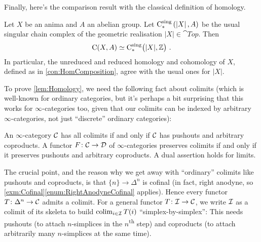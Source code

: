 Finally, here's the comparison result with the classical definition of homology.
\begin{lem}\label{lem:Homology}
	Let $X$ be an anima and $A$ an abelian group. Let $\operatorname{C}_*^\mathrm{sing}\left(\left|X\right|,A\right)$ be the usual singular chain complex of the geometric realisation $\left|X\right|\in\cat{Top}$. Then
	\begin{equation*}
		\C(X,A)\simeq \C^\mathrm{sing}_*\lef(|X|,\IZ\righ)\,.
	\end{equation*}
	In particular, the unreduced and reduced homology and cohomology of $X$, defined as in \cref{con:HomComposition}, agree with the usual ones for $\left|X\right|$.
\end{lem}
To prove \cref{lem:Homology}, we need the following fact about colimits (which is well-known for ordinary categories, but it's perhaps a bit surprising that this works for $\infty$-categories too, given that our colimits can be indexed by arbitrary $\infty$-categories, not just \enquote{discrete} ordinary categories):
\begin{lem}\label{lem:ColimitsIffCoproductsAndPushouts}
	An $\infty$-category $\mathcal{C}$ has all colimits if and only if $\mathcal{C}$ has pushouts and arbitrary coproducts. A functor $F\colon \mathcal{C}\rightarrow\mathcal{D}$ of $\infty$-categories preserves colimits if and only if it preserves pushouts and arbitrary coproducts. A dual assertion holds for limits.
\end{lem}
The crucial point, and the reason why we get away with \enquote{ordinary} colimits like pushouts and coproducts, is that $\{n\}\rightarrow \Delta^n$ is cofinal (in fact, right anodyne, so \cref{exm:Cofinal}\cref{enum:RightAnodyneCofinal} applies). Hence every functor $T\colon \Delta^n\rightarrow \mathcal{C}$ admits a colimit. For a general functor $T\colon\mathcal{I}\rightarrow \mathcal{C}$, we write $\mathcal{I}$ as a colimit of its skeleta to build $\operatorname*{colim}_{i\in\mathcal{I}}T(i)$ \enquote{simplex-by-simplex}: This needs pushouts (to attach $n$-simplices in the $n$\textsuperscript{th} step) and coproducts (to attach arbitrarily many $n$-simplices at the same time). 

